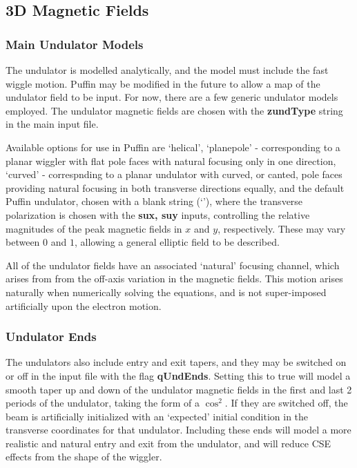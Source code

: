 \documentclass[12pt]{article}%
\begin{document}
\subsection{3D Magnetic Fields}

\label{und-fields}

\subsubsection{Main Undulator Models}

The undulator is modelled analytically, and the model must include the fast wiggle motion. Puffin may be modified in the future to allow a map of the undulator field to be input. For now, there are a few generic undulator models employed. The undulator magnetic fields are chosen with the {\bf zundType} string in the main input file. 

Available options for use in Puffin are `helical', `planepole' - corresponding to a planar wiggler with flat pole faces with natural focusing only in one direction, `curved' - correspnding to a planar undulator with curved, or canted, pole faces providing natural focusing in both transverse directions equally, and the default Puffin undulator, chosen with a blank string (`'), where the transverse polarization is chosen with the {\bf sux, suy} inputs, controlling the relative magnitudes of the peak magnetic fields in $x$ and $y$, respectively. These may vary between $0$ and $1$, allowing a general elliptic field to be described.

All of the undulator fields have an associated `natural' focusing channel, which arises from from the off-axis variation in the magnetic fields. This motion arises naturally when numerically solving the equations, and is not super-imposed artificially upon the electron motion.

\subsubsection{Undulator Ends}

The undulators also include entry and exit tapers, and they may be switched on or off in the input file with the flag {\bf qUndEnds}. Setting this to true will model a smooth taper up and down of the undulator magnetic fields in the first and last 2 periods of the undulator, taking the form of a $\cos^2$. If they are switched off, the beam is artificially initialized with an `expected' initial condition in the transverse coordinates for that undulator. Including these ends will model a more realistic and natural entry and exit from the undulator, and will reduce CSE effects from the shape of the wiggler.
\end{document}
